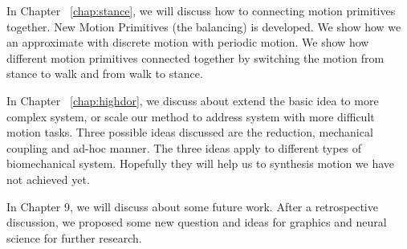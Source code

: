 In Chapter ~\ref{chap:stance}, we will discuss how to connecting motion primitives together.
New Motion Primitives (the balancing) is developed. We show how we an approximate with discrete motion with periodic motion. We show how different motion primitives connected together by switching the motion from stance to walk and from walk to stance.

In Chapter ~\ref{chap:highdor}, we discuss about extend the basic idea to more complex system, or scale our method to address system with more difficult motion tasks. Three possible ideas discussed are the reduction, mechanical coupling and ad-hoc manner. The three ideas apply to different types of biomechanical system.
Hopefully they will help us to synthesis motion we have not achieved yet.

In Chapter 9, we will discuss about some future work. After a retrospective discussion, we proposed some new question and ideas for graphics and neural science for further research.








